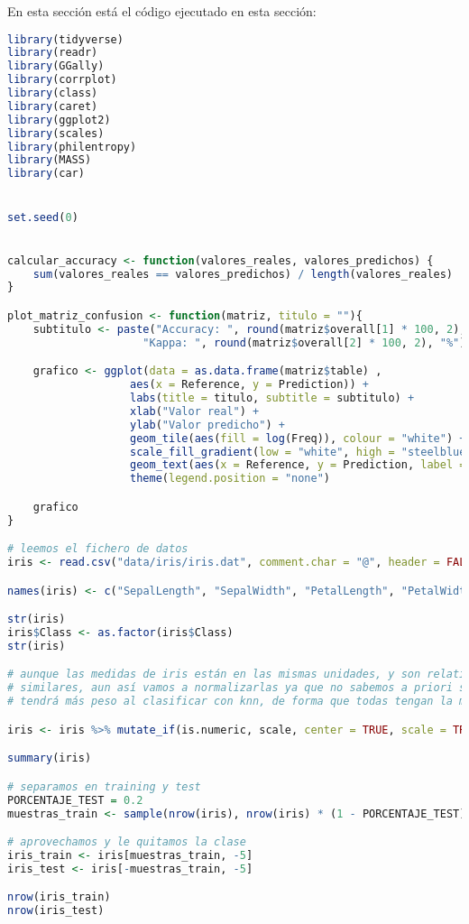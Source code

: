 En esta sección está el código ejecutado en esta sección:


\begin{lstlisting}[language=R]
library(tidyverse)
library(readr)
library(GGally)
library(corrplot)
library(class)
library(caret)
library(ggplot2)
library(scales)
library(philentropy)
library(MASS)
library(car)


set.seed(0)


calcular_accuracy <- function(valores_reales, valores_predichos) {
	sum(valores_reales == valores_predichos) / length(valores_reales)
}

plot_matriz_confusion <- function(matriz, titulo = ""){
	subtitulo <- paste("Accuracy: ", round(matriz$overall[1] * 100, 2), "% \t",
					 "Kappa: ", round(matriz$overall[2] * 100, 2), "%")

	grafico <- ggplot(data = as.data.frame(matriz$table) ,
				   aes(x = Reference, y = Prediction)) +
				   labs(title = titulo, subtitle = subtitulo) +
				   xlab("Valor real") +
				   ylab("Valor predicho") +
				   geom_tile(aes(fill = log(Freq)), colour = "white") +
				   scale_fill_gradient(low = "white", high = "steelblue") +
				   geom_text(aes(x = Reference, y = Prediction, label = Freq)) +
				   theme(legend.position = "none")

	grafico
}

# leemos el fichero de datos
iris <- read.csv("data/iris/iris.dat", comment.char = "@", header = FALSE)

names(iris) <- c("SepalLength", "SepalWidth", "PetalLength", "PetalWidth", "Class")

str(iris)
iris$Class <- as.factor(iris$Class)
str(iris)

# aunque las medidas de iris están en las mismas unidades, y son relativamente
# similares, aun así vamos a normalizarlas ya que no sabemos a priori si alguna
# tendrá más peso al clasificar con knn, de forma que todas tengan la misma importancia

iris <- iris %>% mutate_if(is.numeric, scale, center = TRUE, scale = TRUE)

summary(iris)

# separamos en training y test
PORCENTAJE_TEST = 0.2
muestras_train <- sample(nrow(iris), nrow(iris) * (1 - PORCENTAJE_TEST))

# aprovechamos y le quitamos la clase
iris_train <- iris[muestras_train, -5]
iris_test <- iris[-muestras_train, -5]

nrow(iris_train)
nrow(iris_test)


\end{lstlisting}
